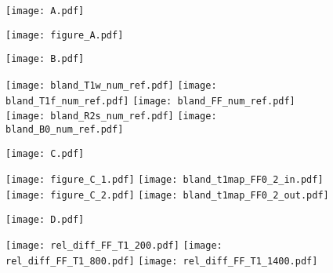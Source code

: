 \documentclass[preview]{standalone}
\begin{document}
\begin{figure}
	\centering
	\begin{minipage}{.03\textwidth}
		\texttt{[image: A.pdf]}\vspace*{2.4cm}
	\end{minipage}
	\hfill %
	\begin{minipage}{.96\textwidth}
		\texttt{[image: figure\_A.pdf]}
	\end{minipage}%

	\vspace*{-0.2cm}

	\begin{minipage}{.03\textwidth}
		\texttt{[image: B.pdf]}\vspace*{2cm}
	\end{minipage}
	\hfill %
	\begin{minipage}{.96\textwidth}
		\texttt{[image: bland\_T1w\_num\_ref.pdf]}\hfill
		\texttt{[image: bland\_T1f\_num\_ref.pdf]}\hfill
		\texttt{[image: bland\_FF\_num\_ref.pdf]}\hfill
		\texttt{[image: bland\_R2s\_num\_ref.pdf]}\hfill
		\texttt{[image: bland\_B0\_num\_ref.pdf]}\hfill
	\end{minipage}%

	\vspace*{-0.2cm}

	\begin{minipage}{.03\textwidth}
		\texttt{[image: C.pdf]}\vspace*{2.4cm}
	\end{minipage}
	\hfill %
	\begin{minipage}{.96\textwidth}
		\texttt{[image: figure\_C\_1.pdf]}
		\hspace*{0.05cm}
		\texttt{[image: bland\_t1map\_FF0\_2\_in.pdf]}\hfill
		\texttt{[image: figure\_C\_2.pdf]}
		\texttt{[image: bland\_t1map\_FF0\_2\_out.pdf]}
		\hspace*{0.4cm}
	\end{minipage}%
	
	\vspace*{0.2cm}

	\begin{minipage}{.03\textwidth}
		\texttt{[image: D.pdf]}\vspace*{2.4cm}%
	\end{minipage}
	\hfill %
	\begin{minipage}{.96\textwidth}
		\hspace*{1cm}
		\texttt{[image: rel\_diff\_FF\_T1\_200.pdf]}\hspace*{0.2cm}
		\texttt{[image: rel\_diff\_FF\_T1\_800.pdf]}\hspace*{0.2cm}
		\texttt{[image: rel\_diff\_FF\_T1\_1400.pdf]}\hfill
	\end{minipage}%
\end{figure}
\end{document}

